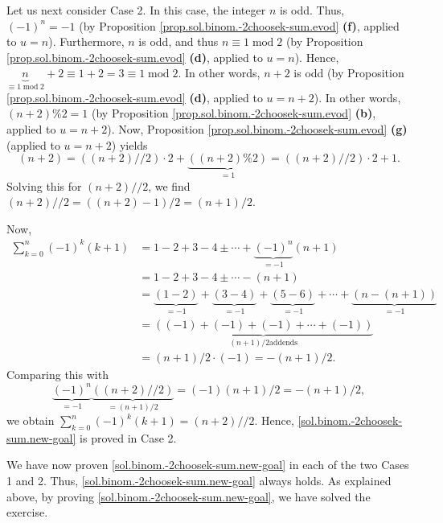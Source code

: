 \documentclass[paper=a4, fontsize=12pt]{scrartcl}%
\let\sumnonlimits\sum
\renewcommand{\sum}{\sumnonlimits\limits}
\theoremstyle{plainsl}
\theoremstyle{definition}
\theoremstyle{remark}
\begin{document}
Let us next consider Case 2. In this case, the integer $n$ is odd. Thus,
$\left(  -1\right)  ^{n}=-1$ (by Proposition
\ref{prop.sol.binom.-2choosek-sum.evod} \textbf{(f)}, applied to $u=n$).
Furthermore, $n$ is odd, and thus $n\equiv1\operatorname{mod}2$ (by
Proposition \ref{prop.sol.binom.-2choosek-sum.evod} \textbf{(d)}, applied to
$u=n$). Hence, $\underbrace{n}_{\equiv1\operatorname{mod}2}+2\equiv
1+2=3\equiv1\operatorname{mod}2$. In other words, $n+2$ is odd (by Proposition
\ref{prop.sol.binom.-2choosek-sum.evod} \textbf{(d)}, applied to $u=n+2$). In
other words, $\left(  n+2\right)  \%2=1$ (by Proposition
\ref{prop.sol.binom.-2choosek-sum.evod} \textbf{(b)}, applied to $u=n+2$).
Now, Proposition \ref{prop.sol.binom.-2choosek-sum.evod} \textbf{(g)} (applied
to $u=n+2$) yields
\[
\left(  n+2\right)  =\left(  \left(  n+2\right)  //2\right)  \cdot
2+\underbrace{\left(  \left(  n+2\right)  \%2\right)  }_{=1}=\left(  \left(
n+2\right)  //2\right)  \cdot2+1.
\]
Solving this for $\left(  n+2\right)  //2$, we find $\left(  n+2\right)
//2=\left(  \left(  n+2\right)  -1\right)  /2=\left(  n+1\right)  /2$.

Now,%
\begin{align*}
\sum_{k=0}^{n}\left(  -1\right)  ^{k}\left(  k+1\right)   &  =1-2+3-4\pm
\cdots+\underbrace{\left(  -1\right)  ^{n}}_{=-1}\left(  n+1\right) \\
&  =1-2+3-4\pm\cdots-\left(  n+1\right) \\
&  =\underbrace{\left(  1-2\right)  }_{=-1}+\underbrace{\left(  3-4\right)
}_{=-1}+\underbrace{\left(  5-6\right)  }_{=-1}+\cdots+\underbrace{\left(
n-\left(  n+1\right)  \right)  }_{=-1}\\
&  =\underbrace{\left(  \left(  -1\right)  +\left(  -1\right)  +\left(
-1\right)  +\cdots+\left(  -1\right)  \right)  }_{\left(  n+1\right)  /2\text{
addends}}\\
&  =\left(  n+1\right)  /2\cdot\left(  -1\right)  =-\left(  n+1\right)  /2.
\end{align*}
Comparing this with%
\[
\underbrace{\left(  -1\right)  ^{n}}_{=-1}\underbrace{\left(  \left(
n+2\right)  //2\right)  }_{=\left(  n+1\right)  /2}=\left(  -1\right)  \left(
n+1\right)  /2=-\left(  n+1\right)  /2,
\]
we obtain $\sum_{k=0}^{n}\left(  -1\right)  ^{k}\left(  k+1\right)  =\left(
n+2\right)  //2$. Hence, \eqref{sol.binom.-2choosek-sum.new-goal} is proved in
Case 2.

We have now proven \eqref{sol.binom.-2choosek-sum.new-goal} in each of the two
Cases 1 and 2. Thus, \eqref{sol.binom.-2choosek-sum.new-goal} always holds. As
explained above, by proving \eqref{sol.binom.-2choosek-sum.new-goal}, we have
solved the exercise.
\end{document}
